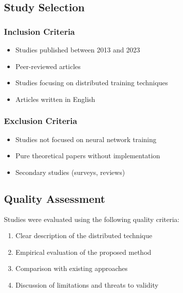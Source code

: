 

\subsection{Study Selection}
\subsubsection{Inclusion Criteria}
\begin{itemize}
    \item Studies published between 2013 and 2023
    \item Peer-reviewed articles
    \item Studies focusing on distributed training techniques
    \item Articles written in English
\end{itemize}

\subsubsection{Exclusion Criteria}
\begin{itemize}
    \item Studies not focused on neural network training
    \item Pure theoretical papers without implementation
    \item Secondary studies (surveys, reviews)
\end{itemize}

\subsection{Quality Assessment}
Studies were evaluated using the following quality criteria:
\begin{enumerate}
    \item Clear description of the distributed technique
    \item Empirical evaluation of the proposed method
    \item Comparison with existing approaches
    \item Discussion of limitations and threats to validity
\end{enumerate}

